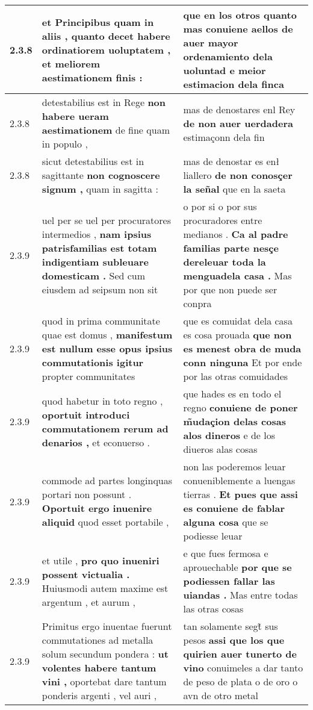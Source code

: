 \begin{tabular}{|p{1cm}|p{6.5cm}|p{6.5cm}|}
2.3.8 & et Principibus quam in aliis , \textbf{ quanto decet habere ordinatiorem uoluptatem , } et meliorem aestimationem finis : & que en los otros \textbf{ quanto mas conuiene aellos de auer mayor ordenamiento dela uoluntad } e meior estimacion dela finca \\\hline
2.3.8 & detestabilius est in Rege \textbf{ non habere ueram aestimationem } de fine quam in populo , & mas de denostares enl Rey \textbf{ de non auer uerdadera } estimaçonn dela fin \\\hline
2.3.8 & sicut detestabilius est in sagittante \textbf{ non cognoscere signum , } quam in sagitta : & mas de denostar es enł liallero \textbf{ de non conosçer la señal } que en la saeta \\\hline
2.3.9 & uel per se uel per procuratores intermedios , \textbf{ nam ipsius patrisfamilias est totam indigentiam subleuare domesticam . } Sed cum eiusdem ad seipsum non sit & o por si o por sus procuradores entre medianos . \textbf{ Ca al padre familias parte nesçe dereleuar toda la menguadela casa . } Mas por que non puede ser conpra \\\hline
2.3.9 & quod in prima communitate quae est domus , \textbf{ manifestum est nullum esse opus ipsius commutationis igitur } propter communitates & que es comuidat dela casa es cosa prouada \textbf{ que non es menest obra de muda conn ninguna } Et por ende por las otras comuidades \\\hline
2.3.9 & quod habetur in toto regno , \textbf{ oportuit introduci commutationem rerum ad denarios , } et econuerso . & que hades es en todo el regno \textbf{ conuiene de poner m̃udaçion delas cosas alos dineros } e de los diueros alas cosas \\\hline
2.3.9 & commode ad partes longinquas portari non possunt . \textbf{ Oportuit ergo inuenire aliquid } quod esset portabile , & non las poderemos leuar conueniblemente a luengas tierras . \textbf{ Et pues que assi es conuiene de fablar alguna cosa } que se podiesse leuar \\\hline
2.3.9 & et utile , \textbf{ pro quo inueniri possent victualia . } Huiusmodi autem maxime est argentum , et aurum , & e que fues fermosa e aprouechable \textbf{ por que se podiessen fallar las uiandas . } Mas entre todas las otras cosas \\\hline
2.3.9 & Primitus ergo inuentae fuerunt commutationes ad metalla solum secundum pondera : \textbf{ ut volentes habere tantum vini , } oportebat dare tantum ponderis argenti , vel auri , & tan solamente segt̃ sus pesos \textbf{ assi que los que quirien auer tunerto de vino } conuimeles a dar tanto de peso de plata o de oro o avn de otro metal \\\hline

\end{tabular}
